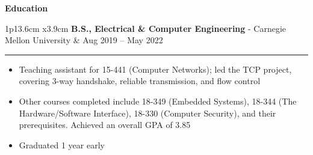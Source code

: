 \documentclass[11pt]{article}
\newcommand{\cvsection}[1]
{
	\begin{center}
		\large\textcolor{sectcol}{\textbf{#1}}
	\end{center}
}
\newcommand{\cvevent}[4]
{

\begin{tabular*}{1\textwidth}{p{13.6cm}  x{3.9cm}}
	\textbf{#2} - \textcolor{bgcol}{#3} &   \vspace{2.5pt}\textcolor{sectcol}{#1}
\end{tabular*}

\vspace{-8pt}
\textcolor{softcol}{\hrule}
\vspace{-3pt}
    #4
}
\begin{document}

        

%
%         

\cvsection{Education}

\cvevent{Aug 2019 -- May 2022}{B.S., Electrical \& Computer Engineering}{Carnegie Mellon University}{
    \begin{itemize}
        \item Teaching assistant for 15-441 (Computer Networks); led the TCP project, covering 3-way handshake, reliable transmission, and flow control
        \item Other courses completed include 18-349 (Embedded Systems), 18-344 (The Hardware/Software Interface), 18-330 (Computer Security), and their prerequisites. Achieved an overall GPA of 3.85
        \item Graduated 1 year early
    \end{itemize}
}
\end{document}
